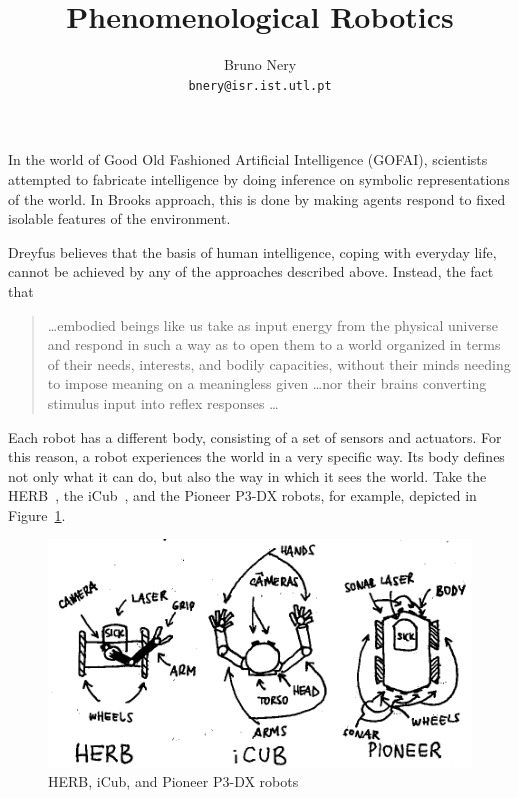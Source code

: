 \documentclass{article}
\title{Phenomenological Robotics}
\author{Bruno Nery\\
        \texttt{bnery@isr.ist.utl.pt}}
\begin{document}
\maketitle

In the world of Good Old Fashioned Artificial Intelligence (GOFAI), scientists
attempted to fabricate intelligence by doing inference on symbolic
representations of the world. In Brooks \cite{brooks91} approach, this is done
by making agents respond to fixed isolable features of the environment.

Dreyfus \cite{dreyfus07} believes that the basis of human intelligence, coping
with everyday life, cannot be achieved by any of the approaches described above.
Instead, the fact that

\begin{quotation}
  \dots embodied beings like us take as input energy from the physical universe
  and respond in such a way as to open them to a world organized in terms of
  their needs, interests, and bodily capacities, without their minds needing to
  impose meaning on a meaningless given \dots nor their brains converting
  stimulus input into reflex responses \dots
\end{quotation}


Each robot has a different body, consisting of a set of sensors and actuators. 
For this reason, a robot experiences the world in a very specific way. Its body
defines not only what it can do, but also the way in which it sees the world.
Take the HERB~\cite{srinivasa2009herb}, the iCub~\cite{metta2010icub}, and the
Pioneer P3-DX robots, for example, depicted in
Figure~\ref{fig:herb_icub_pioneer}.

\begin{figure}[h]
\centering
\includegraphics{figures/herb_icub_pioneer.png}
\caption{HERB, iCub, and Pioneer P3-DX robots}
\label{fig:herb_icub_pioneer}
\end{figure}
\end{document}
